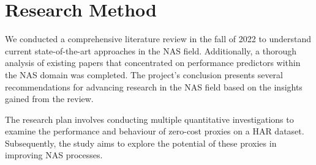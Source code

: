 \section{Research Method}
We conducted a comprehensive literature review in the fall of 2022 to understand current state-of-the-art approaches in the \gls{NAS} field. Additionally, a thorough analysis of existing papers that concentrated on performance predictors within the \gls{NAS} domain was completed. The project's conclusion presents several recommendations for advancing research in the \gls{NAS} field based on the insights gained from the review.

The research plan involves conducting multiple quantitative investigations to examine the performance and behaviour of zero-cost proxies on a \gls{HAR} dataset. Subsequently, the study aims to explore the potential of these proxies in improving \gls{NAS} processes.


